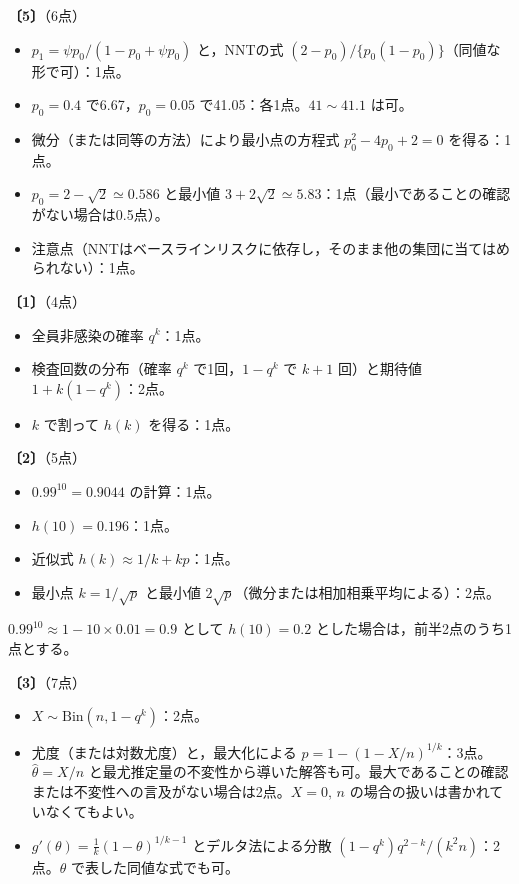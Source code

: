 \documentclass[a4paper,11pt]{ltjsarticle}
\renewcommand{\ans}[1]{\par\medskip\noindent\textbf{〔#1〕}\quad}
\renewcommand{\points}[1]{\hfill\textnormal{（#1点）}\par\nobreak}
\begin{document}
\ans{5}\points{6}
\begin{itemize}
\item $p_1=\psi p_0/(1-p_0+\psi p_0)$ と，NNTの式 $(2-p_0)/\{p_0(1-p_0)\}$（同値な形で可）：1点。
\item $p_0=0.4$ で6.67，$p_0=0.05$ で41.05：各1点。$41\sim41.1$ は可。
\item 微分（または同等の方法）により最小点の方程式 $p_0^2-4p_0+2=0$ を得る：1点。
\item $p_0=2-\sqrt2\simeq0.586$ と最小値 $3+2\sqrt2\simeq5.83$：1点（最小であることの確認がない場合は0.5点）。
\item 注意点（NNTはベースラインリスクに依存し，そのまま他の集団に当てはめられない）：1点。
\end{itemize}
\newpage

\ans{1}\points{4}
\begin{itemize}
\item 全員非感染の確率 $q^k$：1点。
\item 検査回数の分布（確率 $q^k$ で1回，$1-q^k$ で $k+1$ 回）と期待値 $1+k(1-q^k)$：2点。
\item $k$ で割って $h(k)$ を得る：1点。
\end{itemize}

\ans{2}\points{5}
\begin{itemize}
\item $0.99^{10}=0.9044$ の計算：1点。
\item $h(10)=0.196$：1点。
\item 近似式 $h(k)\approx1/k+kp$：1点。
\item 最小点 $k=1/\sqrt p$ と最小値 $2\sqrt p$（微分または相加相乗平均による）：2点。
\end{itemize}
$0.99^{10}\approx1-10\times0.01=0.9$ として $h(10)=0.2$ とした場合は，前半2点のうち1点とする。

\ans{3}\points{7}
\begin{itemize}
\item $X\sim\mathrm{Bin}(n,1-q^k)$：2点。
\item 尤度（または対数尤度）と，最大化による $\hat p=1-(1-X/n)^{1/k}$：3点。
$\hat\theta=X/n$ と最尤推定量の不変性から導いた解答も可。最大であることの確認または不変性への言及がない場合は2点。$X=0,\,n$ の場合の扱いは書かれていなくてもよい。
\item $g'(\theta)=\frac1k(1-\theta)^{1/k-1}$ とデルタ法による分散 $(1-q^k)q^{2-k}/(k^2n)$：2点。$\theta$ で表した同値な式でも可。
\end{itemize}
\end{document}
